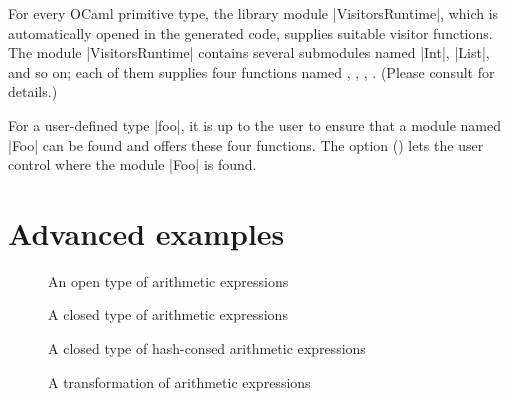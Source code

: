 \documentclass[11pt,a4paper,twoside]{article}
\begin{document}
For every OCaml primitive type, the library module \oc|VisitorsRuntime|, which
is automatically opened in the generated code, supplies suitable visitor
functions. The module \oc|VisitorsRuntime| contains several submodules named
\oc|Int|, \oc|List|, and so on; each of them supplies four functions named
\iter, \map, \itertwo, \maptwo. (Please consult 
for details.)

For a user-defined type \oc|foo|, it is up to the user to ensure that a module
named \oc|Foo| can be found and offers these four functions. The \nonlocal
option () lets the user control where the module \oc|Foo|
is found.


\section{Advanced examples}
\label{sec:advanced}


\begin{figure}[p]
\vspace{-\baselineskip}
\caption{An open type of arithmetic expressions} %
\label{fig:expr12}
\end{figure}

\begin{figure}[p]
\caption{A closed type of arithmetic expressions}
\label{fig:expr13}
\end{figure}

\begin{figure}[p]
\caption{A closed type of hash-consed arithmetic expressions}
\label{fig:expr08}
\end{figure}

\begin{figure}[p]
\caption{A transformation of arithmetic expressions}
\label{fig:expr13double}
\end{figure}
\end{document}
